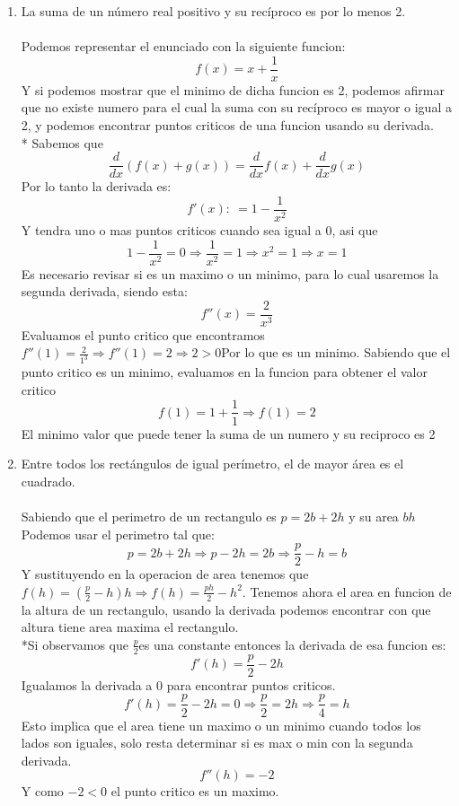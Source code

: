 \documentclass[12pt]{article}
\begin{document}
\begin{enumerate}[\hspace{9px} a)]
    \item La suma de un n\'umero real positivo y su rec\'iproco es por lo menos 2.\\ \\
    Podemos representar el enunciado con la siguiente funcion:
    \[f(x) = x+\displaystyle\frac{1}{x}\] 
    Y si podemos mostrar que el minimo de dicha funcion es 2, podemos afirmar que no existe numero para el cual la suma con su rec\'iproco es mayor o igual a 2, y podemos encontrar puntos criticos de una funcion usando su derivada.\\*
    Sabemos que \[\displaystyle\frac{d}{dx}(f(x)+g(x)) = \displaystyle\frac{d}{dx}f(x)+\displaystyle\frac{d}{dx}g(x)\]
    Por lo tanto la derivada es: 
    \[f'(x): \ = 1-\displaystyle\frac{1}{x^2}\]
    Y tendra uno o mas puntos criticos cuando sea igual a 0, asi que \[1-\displaystyle\frac{1}{x^2}=0\Rightarrow\displaystyle\frac{1}{x^2}=1\Rightarrow x^2 = 1 \Rightarrow x=1\]   
    Es necesario revisar si es un maximo o un minimo, para lo cual usaremos la segunda derivada, siendo esta: \[f''(x)=\displaystyle\frac{2}{x^3}\]
    Evaluamos el punto critico que encontramos \(f''(1)=\displaystyle\frac{2}{1^3}\Rightarrow f''(1)=2\Rightarrow 2>0\)\quad Por lo que es un minimo.
    Sabiendo que el punto critico es un minimo, evaluamos en la funcion para obtener el valor critico
    \[f(1)=1+\displaystyle\frac{1}{1}\Rightarrow f(1)=2\]
    El minimo valor que puede tener la suma de un numero y su reciproco es 2\medskip

    \item Entre todos los rect\'angulos de igual per\'imetro, el de mayor \'area es el cuadrado.\\ \\
    Sabiendo que el perimetro de un rectangulo es \(p=2b+2h\) y su area \(bh\)
    Podemos usar el perimetro tal que: \[p=2b+2h\Rightarrow p-2h=2b\Rightarrow \displaystyle\frac{p}{2}-h=b\]
    Y sustituyendo en la operacion de area tenemos que \(f(h)=(\displaystyle\frac{p}{2}-h)h\Rightarrow f(h)=\displaystyle\frac{ph}{2}-h^2\).
    Tenemos ahora el area en funcion de la altura de un rectangulo, usando la derivada podemos encontrar con que altura tiene area maxima el rectangulo. \\*Si observamos que \(\displaystyle\frac{p}{2}\)es una constante entonces la derivada de esa funcion es: 
    \[f'(h)=\displaystyle\frac{p}{2}-2h\]
    Igualamos la derivada a 0 para encontrar puntos criticos.
    \[f'(h)=\displaystyle\frac{p}{2}-2h=0\Rightarrow \displaystyle\frac{p}{2}=2h\Rightarrow \displaystyle\frac{p}{4}=h\]
    Esto implica que el area tiene un maximo o un minimo cuando todos los lados son iguales, solo resta determinar si es max o min con la segunda derivada.
    \[f''(h)=-2\]
    Y como \(-2<0\) el punto critico es un maximo.\medskip


\end{enumerate}
\end{document}
